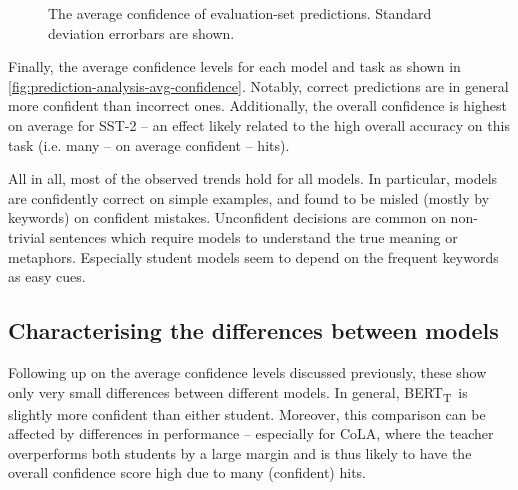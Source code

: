 \documentclass[bsc,frontabs,twoside,singlespacing,parskip,deptreport]{infthesis}
\def\BERTT{BERT\textsubscript{T}}
\begin{document}
{{{      \begin{figure}[h!tb]
        \centering
        \caption{The average confidence of evaluation-set predictions. Standard deviation errorbars are shown.}
        \label{fig:prediction-analysis-avg-confidence}
      \end{figure}
      Finally, the average confidence levels for each model and task as shown in \autoref{fig:prediction-analysis-avg-confidence}. Notably, correct predictions are in general more confident than incorrect ones. Additionally, the overall confidence is highest on average for SST-2 -- an effect likely related to the high overall accuracy on this task (i.e. many -- on average confident -- hits).

      All in all, most of the observed trends hold for all models. In particular, models are confidently correct on simple examples, and found to be misled (mostly by keywords) on confident mistakes. Unconfident decisions are common on non-trivial sentences which require models to understand the true meaning or metaphors. Especially student models seem to depend on the frequent keywords as easy cues.
    }
    
    \subsection{Characterising the differences between models}{
      Following up on the average confidence levels discussed previously, these show only very small differences between different models. In general, \BERTT~is slightly more confident than either student. Moreover, this comparison can be affected by differences in performance -- especially for CoLA, where the teacher overperforms both students by a large margin and is thus likely to have the overall confidence score high due to many (confident) hits.

}}}
\end{document}
